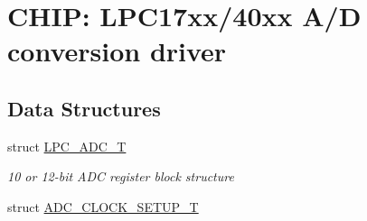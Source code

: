 \hypertarget{group__ADC__17XX__40XX}{\section{C\-H\-I\-P\-: L\-P\-C17xx/40xx A/\-D conversion driver}
\label{group__ADC__17XX__40XX}
}
\subsection*{Data Structures}
\begin{DoxyCompactItemize}
\item 
struct \hyperlink{structLPC__ADC__T}{L\-P\-C\-\_\-\-A\-D\-C\-\_\-\-T}
\begin{DoxyCompactList}\small\item\em 10 or 12-\/bit A\-D\-C register block structure \end{DoxyCompactList}\item 
struct \hyperlink{structADC__CLOCK__SETUP__T}{A\-D\-C\-\_\-\-C\-L\-O\-C\-K\-\_\-\-S\-E\-T\-U\-P\-\_\-\-T}
\end{DoxyCompactItemize}
